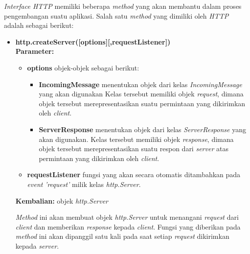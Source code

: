 \textit{Interface HTTP} memiliki beberapa \textit{method} yang akan membantu dalam proses pengembangan suatu aplikasi. Salah satu \textit{method} yang dimiliki oleh \textit{HTTP} adalah sebagai berikut:
\begin{itemize}
	\item \textbf{http.createServer([options][,requestListener])} \\ 
	\textbf{Parameter:}
	\begin{itemize}
		\item \textbf{options} objek-objek sebagai berikut:
			\begin{itemize}
				\item \textbf{IncomingMessage} menentukan objek dari kelas \textit{IncomingMessage} yang akan digunakan Kelas tersebut memiliki objek \textit{request}, dimana objek tersebut merepresentasikan suatu permintaan yang dikirimkan oleh \textit{client}.
				\item \textbf{ServerResponse} menentukan objek dari kelas \textit{ServerResponse} yang akan digunakan. Kelas tersebut memiliki objek \textit{response}, dimana objek tersebut merepresentasikan suatu respon dari \textit{server} atas permintaan yang dikirimkan oleh \textit{client}.
			\end{itemize}
			
		\item \textbf{requestListener} fungsi yang akan secara otomatis ditambahkan pada \textit{event} \textit{'request'} milik kelas \textit{http.Server}.
	\end{itemize}
	\textbf{Kembalian:} objek \textit{http.Server}
	
	\textit{Method} ini akan membuat objek \textit{http.Server} untuk menangani \textit{request} dari \textit{client} dan memberikan \textit{response} kepada \textit{client}. Fungsi yang diberikan pada \textit{method} ini akan dipanggil satu kali pada saat setiap \textit{request} dikirimkan kepada \textit{server}.
	

\end{itemize}
